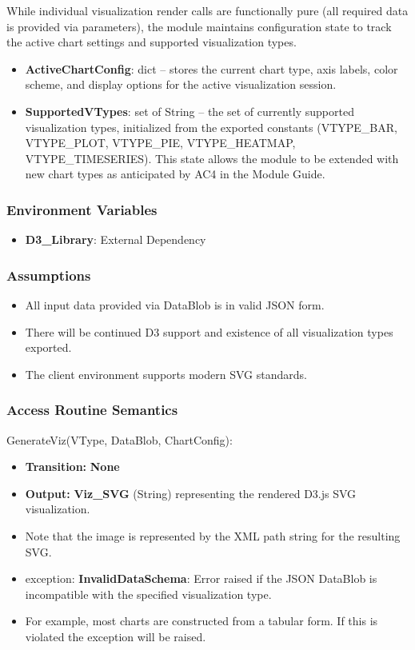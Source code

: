 \documentclass[12pt, titlepage]{article}
\begin{document}
While individual visualization render calls are functionally pure (all required data is provided via parameters), the module maintains configuration state to track the active chart settings and supported visualization types.

\begin{itemize}
  \item \textbf{ActiveChartConfig}: dict -- stores the current chart type, axis labels, color scheme, and display options for the active visualization session.
  \item \textbf{SupportedVTypes}: set of String -- the set of currently supported visualization types, initialized from the exported constants (VTYPE\_BAR, VTYPE\_PLOT, VTYPE\_PIE, VTYPE\_HEATMAP, VTYPE\_TIMESERIES). This state allows the module to be extended with new chart types as anticipated by AC4 in the Module Guide.
\end{itemize}

\subsubsection{Environment Variables}

\begin{itemize}
  \item \textbf{D3\_Library}: External Dependency 
\end{itemize}
\subsubsection{Assumptions}


\begin{itemize}
  \item All input data provided via DataBlob is in valid JSON form.
  \item There will be continued D3 support and existence of all visualization types exported. 
  \item The client environment supports modern SVG standards. 
\end{itemize}


\subsubsection{Access Routine Semantics}

GenerateViz(VType, DataBlob, ChartConfig):
\begin{itemize}
\item  \textbf{Transition:} \textbf{None}
\item  \textbf{Output:} \textbf{Viz\_SVG} (String) representing the rendered D3.js SVG visualization. 
\item[] Note that the image is represented by the XML path string for the resulting SVG. 
\item exception: \textbf{InvalidDataSchema}: Error raised if the JSON DataBlob is incompatible with the specified visualization type.
\item[] For example, most charts are constructed from a tabular form. If this is violated the exception will be raised. 
\end{itemize}
\end{document}
